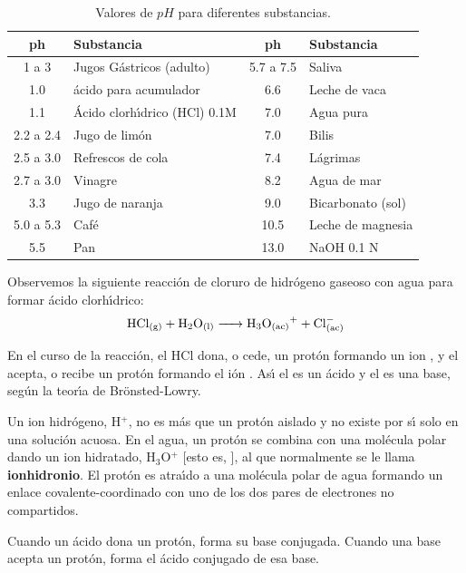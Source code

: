 \begin{table}[ht]
\begin{center}
\caption{Valores de $pH$ para diferentes substancias.}
\label{tabla8}
{\small \begin{tabular}{|cl|cl|} \hline
\textbf{\gls{ph}} & \textbf{Substancia}&\textbf{\gls{ph}} &
\textbf{Substancia}\\\hline 1 a 3 & Jugos G\'astricos (adulto)& 5.7 a 7.5 &
Saliva\\ 1.0 & \'acido para acumulador&6.6 & Leche de vaca\\
1.1 &  \'Acido clorh\'{\i}drico (HCl) 0.1M & 7.0& Agua pura\\
2.2 a 2.4 & Jugo de lim\'on&7.0 & Bilis\\
2.5 a 3.0 &  Refrescos de cola& 7.4&  L\'agrimas \\
2.7 a 3.0 &  Vinagre& 8.2  &Agua de mar\\
3.3 & Jugo de naranja &  9.0 & Bicarbonato (sol)\\
5.0 a 5.3 & Caf\'e & 10.5 & Leche de magnesia\\
5.5 & Pan & 13.0 & NaOH 0.1 N\\ \hline
\end{tabular}}
\end{center}
\end{table}

Observemos la siguiente reacci\'on de cloruro de hidr\'ogeno gaseoso con agua para formar \'acido clorh\'{\i}drico:
\begin{equation}
\ce{HCl_{(g)} + H2O_{(l)} -> H3O+_{(ac)} + Cl^-_{(ac)}}
\label{ac:1}
\end{equation}

En el curso de la reacci\'on, el HCl dona, o cede, un prot\'on formando un ion , y el  acepta, o recibe un prot\'on formando el i\'on . As\'{\i} el  es un \'acido y el  es una base, seg\'un la teor\'{\i}a de Br\"onsted-Lowry.

Un ion hidr\'ogeno, H$^+$, no es m\'as que un prot\'on aislado y no existe por s\'{\i} solo en una soluci\'on acuosa. En el agua, un prot\'on se combina con una mol\'ecula polar dando un ion hidratado,
H$_3$O$^+$ [esto es, ], al que normalmente se le llama \textbf{\gls{ionhidronio}}. El prot\'on es atra\'{\i}do a una mol\'ecula polar de agua formando un enlace covalente-coordinado con uno de los dos pares de electrones no compartidos.

Cuando un \'acido  dona un prot\'on, forma su base conjugada. Cuando una base acepta un prot\'on, forma el \'acido conjugado de esa base.

